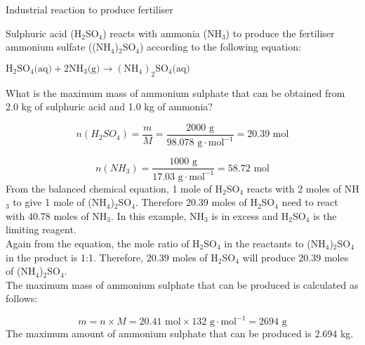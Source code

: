 \begin{wex}{Industrial reaction to produce fertiliser}{Sulphuric acid (H$_{2}$SO$_{4}$) reacts with ammonia (NH$_{3}$) to produce the fertiliser ammonium sulfate ((NH$_{4}$)$_{2}$SO$_{4}$) according to the following equation:

\begin{center}
$\text{H}_{2}\text{SO}_{4}\text{(aq)} + 2\text{NH}_{3}\text{(g)} \rightarrow (\text{NH}_{4})_{2}\text{SO}_{4}\text{(aq)}$
\end{center}

What is the maximum mass of ammonium sulphate that can be obtained from 2.0 kg of sulphuric acid and 1.0 kg of ammonia?
}
{
\begin{equation*}
n(H_{2}SO_{4}) = \frac{m}{M} = \frac{2000 \text{ g}}{98.078 \text{ g} \cdot \text{mol}^{-1}} = 20.39 \text{ mol}
\end{equation*}

\begin{equation*}
n(NH_{3}) = \frac{1000 \text{ g}}{17.03 \text{ g} \cdot \text{mol}^{-1}} = 58.72 \text{ mol}
\end{equation*}
From the balanced chemical equation, 1 mole of H$_{2}$SO$_{4}$ reacts with 2 moles of NH$_{3}$ to give 1 mole of (NH$_{4}$)$_{2}$SO$_{4}$. Therefore 20.39 moles of H$_{2}$SO$_{4}$ need to react with 40.78 moles of NH$_{3}$. In this example, NH$_{3}$ is in excess and H$_{2}$SO$_{4}$ is the limiting reagent.\\
Again from the equation, the mole ratio of H$_{2}$SO$_{4}$ in the reactants to (NH$_{4}$)$_{2}$SO$_{4}$ in the product is 1:1. Therefore, 20.39 moles of H$_{2}$SO$_{4}$ will produce 20.39 moles of (NH$_{4}$)$_{2}$SO$_{4}$.\\

The maximum mass of ammonium sulphate that can be produced is calculated as follows:

\begin{equation*}
m = n \times M = 20.41 \text{ mol} \times 132 \text{ g} \cdot \text{mol}^{-1} = 2694 \text{ g}
\end{equation*}
The maximum amount of ammonium sulphate that can be produced is 2.694 kg.
}
\end{wex}


